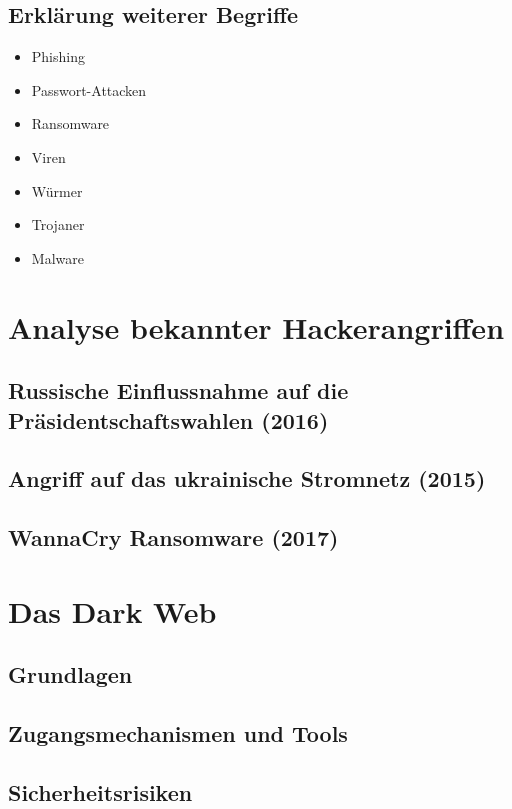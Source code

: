 \documentclass[11pt, a4paper]{article}
\begin{document}
\subsection{Erklärung weiterer Begriffe}
\begin{itemize}
	\item Phishing
	\item Passwort-Attacken
	\item Ransomware
	\item Viren
	\item Würmer
	\item Trojaner
	\item Malware
\end{itemize}


\section{Analyse bekannter Hackerangriffen}

\subsection{Russische Einflussnahme auf die Präsidentschaftswahlen (2016)}

\subsection{Angriff auf das ukrainische Stromnetz (2015)}

\subsection{WannaCry Ransomware (2017)}


\section{Das Dark Web}

\subsection{Grundlagen}

\subsection{Zugangsmechanismen und Tools}

\subsection{Sicherheitsrisiken}
\end{document}
